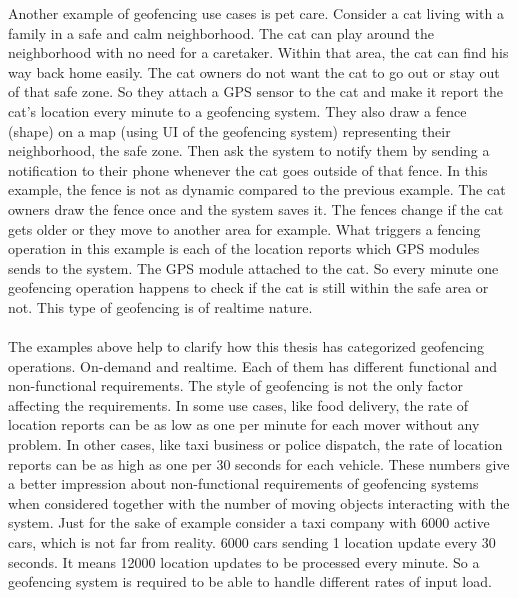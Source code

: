 \documentclass[a4]{report}
\begin{document}
    Another example of geofencing use cases is pet care\cite{pet-geofencing}.
    Consider a cat living with a family in a safe and calm neighborhood.
    The cat can play around the neighborhood with no need for a caretaker.
    Within that area, the cat can find his way back home easily.
    The cat owners do not want the cat to go out or stay out of that safe zone.
    So they attach a GPS sensor to the cat and make it report the cat's location every minute to a geofencing system.
    They also draw a fence (shape) on a map (using UI of the geofencing system) representing their neighborhood, the safe zone.
    Then ask the system to notify them by sending a notification to their phone whenever the cat goes outside of that fence.
    In this example, the fence is not as dynamic compared to the previous example.
    The cat owners draw the fence once and the system saves it.
    The fences change if the cat gets older or they move to another area for example.
    What triggers a fencing operation in this example is each of the location reports which GPS modules sends to the
    system.
    The GPS module attached to the cat.
    So every minute one geofencing operation happens to check if the cat is still within the safe area or
    not.
    This type of geofencing is of realtime nature.

    \paragraph{}
    The examples above help to clarify how this thesis has categorized geofencing operations.
    On-demand and realtime.
    Each of them has different functional and non-functional requirements.
    The style of geofencing is not the only factor affecting the requirements.
    In some use cases, like food delivery,  the rate of location reports can be as low as one per minute for each
    mover without any problem.
    In other cases, like taxi business or police dispatch, the rate of location reports can be as high as one per 30
    seconds for each vehicle.
    These numbers give a better impression about non-functional requirements of geofencing systems when considered
    together with the number of moving objects interacting with the system.
    Just for the sake of example consider a taxi company with 6000 active cars, which is not far from reality.
    6000 cars sending 1 location update every 30 seconds.
    It means 12000 location updates to be processed every minute.
    So a geofencing system is required to be able to handle different rates of input load.
\end{document}
